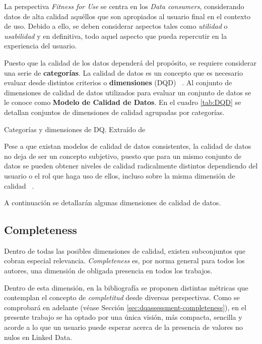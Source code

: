 La perspectiva \textit{Fitness for Use} se centra en los \textit{Data consumers},
considerando datos de alta calidad aquéllos que son apropiados al usuario final
en el contexto de uso. Debido a ello, se deben considerar aspectos tales como
\textit{utilidad} o \textit{usabilidad} y en definitiva, todo aquel aspecto que
pueda repercutir en la experiencia del usuario. 

Puesto que la calidad de los datos dependerá del propósito, se requiere
considerar una serie de \textbf{categorías}. La calidad de datos es un concepto
que es necesario evaluar desde distintos criterios o \textbf{dimensiones} (\acf{DQD})
~\cite{Strong:1997:DQC:253769.253804}. Al conjunto de dimensiones de calidad de
datos utilizados para evaluar un conjunto de datos se le conoce como
\textbf{Modelo de Calidad de Datos}. En el cuadro \ref{tab:DQD} se detallan
conjuntos de dimensiones de calidad agrupadas por categorías. 


\begin{table}[!h]
  \centering
  {\small
  
  }
  \caption[Categorías y dimensiones de \acs{DQ}]
  {Categorías y dimensiones de \acs{DQ}. Extraído de \cite{Strong:1997:DQC:253769.253804}}
  \label{tab:DQD}
\end{table}


Pese a que existan modelos de calidad de datos consistentes, la calidad de datos
no deja de ser un concepto subjetivo, puesto que para un mismo conjunto de
datos se pueden obtener niveles de calidad radicalmente distintos dependiendo del
usuario o el rol que haga uso de ellos, incluso sobre la misma dimensión de
calidad ~\cite{Wang:1998:PPT:269012.269022}. 

A continuación se detallarán algunas dimensiones de calidad de datos. 

\subsection{Completeness}
\label{sbs:completeness}

Dentro de todas las posibles dimensiones de calidad, existen subconjuntos que
cobran especial relevancia. \textit{Completeness} es, por norma general para
todos los autores, una dimensión de obligada presencia en todos los trabajos. 

Dentro de esta dimensión, en la bibliografía se proponen distintas métricas que
contemplan el concepto de \textit{completitud} desde diversas perspectivas. Como
se comprobará en adelante (véase Sección \ref{sec:dqassessment-completeness}), en el presente trabajo se ha optado por una única
visión, más compacta, sencilla y acorde a lo que un usuario puede esperar acerca
de la presencia de valores no nulos en Linked Data.

